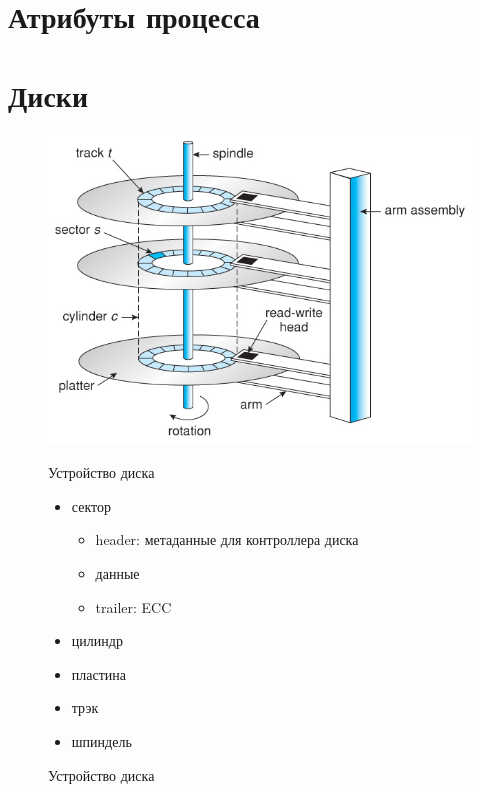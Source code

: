 \documentclass[../../lectures.tex]{subfiles}
\begin{document}
\section{Атрибуты процесса}

\section{Диски}
\begin{figure}[H]
\begin{minipage}[c]{0.6\linewidth}
\centering
\includegraphics[width=\textwidth]{images/disk-mechanism.jpg}
\caption{Устройство диска}
\end{minipage}
\begin{minipage}[c]{0.4\linewidth}
\centering
Устройство диска
\begin{itemize}
  \item сектор
        \begin{itemize}
            \item header: метаданные для контроллера диска
            \item данные
            \item trailer: ECC
        \end{itemize}
  \item цилиндр
  \item пластина
  \item трэк
  \item шпиндель
\end{itemize}
\end{minipage}
\end{figure}
\end{document}
